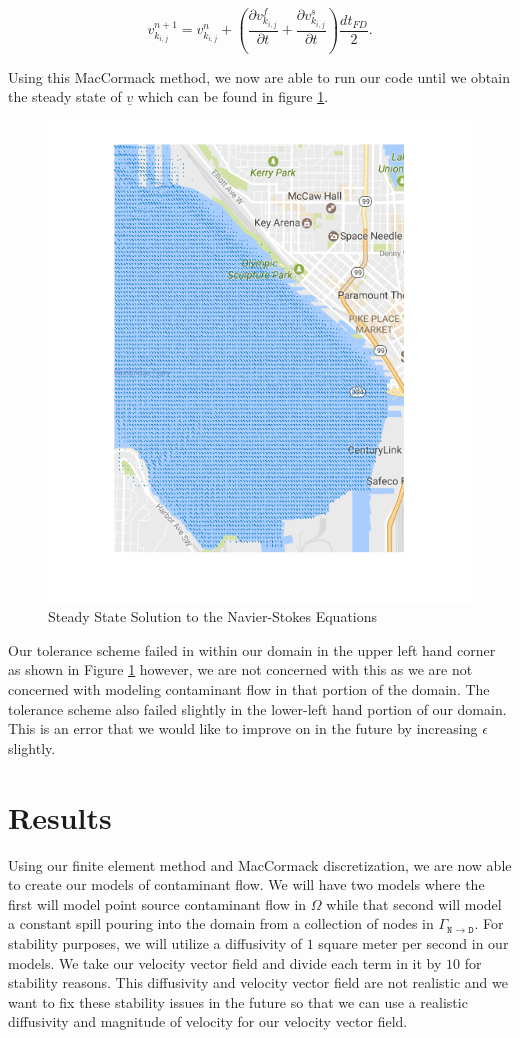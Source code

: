 \documentclass[a4paper]{article}
\theoremstyle{remark}
\theoremstyle{remark}
\begin{document}
\begin{equation}\label{fullstep}
v^{n+1}_{k_{i,j}}=v^{n}_{k_{i,j}}+\left(\frac{\partial v^{f}_{k_{i,j}}}{\partial t}+\frac{\partial v^{s}_{k_{i,j}}}{\partial t}\right)\frac{dt_{FD}}{2}.
\end{equation}

\noindent Using this MacCormack method, we now are able to run our code until we obtain the steady state of $\underline{v}$ which can be found in figure \ref{navierstokessteadystate}.

\begin{figure}[H]  
\centering   
   \includegraphics[width=0.4\linewidth]{navierstokessteadystate.png}
    \caption{Steady State Solution to the Navier-Stokes Equations}
    \label{navierstokessteadystate}
\end{figure}

Our tolerance scheme failed in within our domain in the upper left hand corner as shown in Figure \ref{navierstokessteadystate}
however, we are not concerned with this as we are not concerned with modeling contaminant flow in that portion of the domain. The tolerance scheme also failed slightly in the lower-left hand portion of our domain. This is an error that we would like to improve on in the future by increasing $\epsilon$ slightly.


\section{Results} \label{Results Section}
Using our finite element method and MacCormack discretization, we are now able to create our models of contaminant flow. We will have two models where the first will model point source contaminant flow in $\Omega$ while that second will model a constant spill pouring into the domain from a collection of nodes in $\Gamma_{\texttt{N $\rightarrow$ D}}$. For stability purposes, we will utilize a diffusivity of $1$ square meter per second in our models. We take our velocity vector field and divide each term in it by $10$ for stability reasons. This diffusivity and velocity vector field are not realistic and we want to fix these stability issues in the future so that we can use a realistic diffusivity and magnitude of velocity for our velocity vector field.
\end{document}

